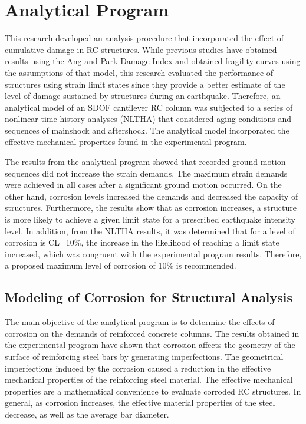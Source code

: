 \chapter{Analytical Program}
\label{chap-five}
This research developed an analysis procedure that incorporated the effect of cumulative damage in RC structures. While previous studies have obtained results using the Ang and Park Damage Index and obtained fragility curves using the assumptions of that model, this research evaluated the performance of structures using strain limit states since they provide a better estimate of the level of damage sustained by structures during an earthquake. Therefore, an analytical model of an SDOF cantilever RC column was subjected to a series of nonlinear time history analyses (NLTHA) that considered aging conditions and sequences of mainshock and aftershock. The analytical model incorporated the effective mechanical properties found in the experimental program.

The results from the analytical program showed that recorded ground motion sequences did not increase the strain demands. The maximum strain demands were achieved in all cases after a significant ground motion occurred. On the other hand, corrosion levels increased the demands and decreased the capacity of structures. Furthermore, the results show that as corrosion increases, a structure is more likely to achieve a given limit state for a prescribed earthquake intensity level. In addition, from the NLTHA results, it was determined that for a level of corrosion is CL=10\%, the increase in the likelihood of reaching a limit state increased, which was congruent with the experimental program results. Therefore, a proposed maximum level of corrosion of 10\% is recommended.

\section{Modeling of Corrosion for Structural Analysis}

The main objective of the analytical program is to determine the effects of corrosion on the demands of reinforced concrete columns. The results obtained in the experimental program have shown that corrosion affects the geometry of the surface of reinforcing steel bars by generating imperfections. The geometrical imperfections induced by the corrosion caused a reduction in the effective mechanical properties of the reinforcing steel material. The effective mechanical properties are a mathematical convenience to evaluate corroded RC structures. In general, as corrosion increases, the effective material properties of the steel decrease, as well as the average bar diameter.

